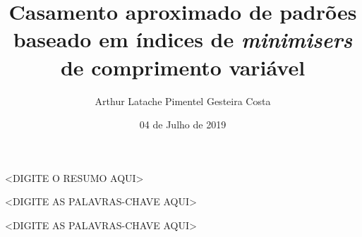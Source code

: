 \documentclass[bsc, oneside, scr, 12pt]{ufpethesis}
\institute{Centro de Informática}
\title{Casamento aproximado de padrões baseado em índices de \textit{minimisers} de comprimento variável}
\date{04 de Julho de 2019}
\author{Arthur Latache Pimentel Gesteira Costa}
\begin{document}
\frontmatter

\frontpage

\presentationpage




\doublespace
\linenumbers


\resumo
<DIGITE O RESUMO AQUI>
\begin{keywords}
<DIGITE AS PALAVRAS-CHAVE AQUI>
\end{keywords}

\abstract
\begin{keywords}
<DIGITE AS PALAVRAS-CHAVE AQUI>
\end{keywords}

\tableofcontents

\listoffigures

\listoftables



\mainmatter

% 
% 
% 
\end{document}
